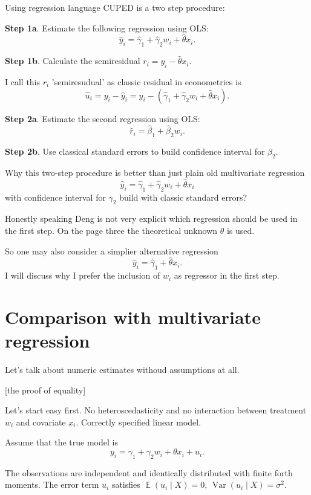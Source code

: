 \documentclass[10pt, a4paper]{article}
\DeclareMathOperator{\Var}{Var}
\DeclareMathOperator{\E}{\mathbb{E}}
\begin{document}
Using regression language CUPED is a two step procedure:

\textbf{Step 1a}. Estimate the following regression using OLS: 
\[
    \hat y_i = \hat \gamma_1 + \hat\gamma_2 w_i + \hat \theta x_i.
\]

\textbf{Step 1b}. Calculate the semiresidual $r_i = y_i - \hat \theta x_i$.

I call this $r_i$ 'semiresudual' as classic residual in econometrics is 
\[
\hat u_i = y_i - \hat y_i = y_i - (\hat\gamma_1 + \hat\gamma_2 w_i + \hat\theta x_i).
\]


\textbf{Step 2a}. Estimate the second regression using OLS:
\[
    \hat r_i = \hat \beta_1 + \hat \beta_2 w_i.
\]

\textbf{Step 2b}. Use classical standard errors to build confidence interval for $\beta_2$.


Why this two-step procedure is better than just plain old multivariate regression
\[
    \hat y_i = \hat \gamma_1 + \hat\gamma_2 w_i + \hat \theta x_i
\]
with confidence interval for $\gamma_2$ build with classic standard errors? 



Honestly speaking Deng is not very explicit which regression should be used in the first step.  
On the page three the theoretical unknown $\theta$ is used. 

So one may also consider a simplier alternative regression
\[
    \hat y_i = \hat \gamma_1 + \hat \theta x_i.
\]
I will discuss why I prefer the inclusion of $w_i$ as regressor in the first step.




\section{Comparison with multivariate regression}

Let's talk about numeric estimates withoud assumptions at all. 

[the proof of equality]






Let's start easy first. No heteroscedasticity and no interaction between treatment $w_i$ and covariate $x_i$.
Correctly specified linear model. 

Assume that the true model is 
\[
y_i = \gamma_1 + \gamma_2 w_i + \theta x_i + u_i.
\]

The observations are independent and identically distributed with finite forth moments. 
The error term $u_i$ satisfies $\E(u_i \mid X) = 0$, $\Var(u_i \mid X) = \sigma^2$.
\end{document}

